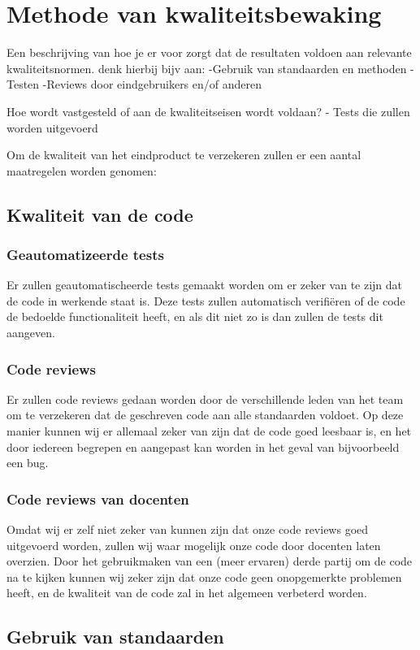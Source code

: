 \chapter{Methode van kwaliteitsbewaking}
Een beschrijving van hoe je er voor zorgt dat de resultaten voldoen aan relevante kwaliteitsnormen.
denk hierbij bijv aan: 
-Gebruik van standaarden en methoden
-Testen
-Reviews door eindgebruikers en/of anderen

Hoe wordt vastgesteld of aan de kwaliteitseisen wordt voldaan?
-
Tests die zullen worden uitgevoerd


Om de kwaliteit van het eindproduct te verzekeren zullen er een aantal maatregelen worden genomen:

\section{Kwaliteit van de code}
	\subsection{Geautomatizeerde tests}
		Er zullen geautomatischeerde tests gemaakt worden om er zeker van te zijn dat de code in werkende staat is.
		Deze tests zullen automatisch verifiëren of de code de bedoelde functionaliteit heeft, en als dit niet zo is dan zullen de tests dit aangeven.

	\subsection{Code reviews}
		Er zullen code reviews gedaan worden door de verschillende leden van het team om te verzekeren dat de geschreven code aan alle standaarden voldoet.
		Op deze manier kunnen wij er allemaal zeker van zijn dat de code goed leesbaar is, en het door iedereen begrepen en aangepast kan worden in het geval van bijvoorbeeld een bug.
		
	\subsection{Code reviews van docenten}
		Omdat wij er zelf niet zeker van kunnen zijn dat onze code reviews goed uitgevoerd worden, zullen wij waar mogelijk onze code door docenten laten overzien.
		Door het gebruikmaken van een (meer ervaren) derde partij om de code na te kijken kunnen wij zeker zijn dat onze code geen onopgemerkte problemen heeft, en de kwaliteit van de code zal in het algemeen verbeterd worden.

\section{Gebruik van standaarden}
